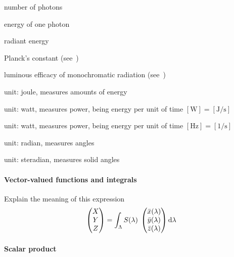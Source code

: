 \begin{description}[leftmargin=!,labelwidth={5em}]
\item[{$N_p\;[]$} ] number of photons
\item[{$Q_p\;[\unit\joule]$} ] energy of one photon
\item[{$Q_e\;[\unit\joule]$} ] radiant energy


\item[{$h$} ] Planck's constant (see~\cite{bipm:si.2019})
\item[{$K_{cd}$} ] luminous efficacy of monochromatic radiation (see~\cite{bipm:si.2019})

\item[{$\unit\joule$} ] unit: joule, measures amounts of energy
\item[{$\unit\watt$} ] unit: watt, measures power, being energy per 
	unit of time $[\unit\watt] = [\unit{\joule\per\second}]$
\item[{$\unit\hertz$} ] unit: watt, measures power, being energy per 
	unit of time $[\unit\hertz] = [\unit{1\per\second}]$
\item[{$\unit\radian$} ] 	unit: radian, measures angles
\item[{$\unit\steradian$} ] unit: steradian, measures solid angles
                   
\end{description}

\paragraph{Vector-valued functions and integrals}

\begin{inconstruction}
	Explain the meaning of this expression
	\begin{displaymath}
		\begin{pmatrix}X\\Y\\Z\end{pmatrix}
		= \int_\Lambda S(\lambda)\; 
		\begin{pmatrix}
			\bar x(\lambda)\\
			\bar y(\lambda)\\
			\bar z(\lambda)
		\end{pmatrix}
		\mathop{}\!\mathrm{d}\lambda
	\end{displaymath}
\end{inconstruction}


\paragraph{Scalar product}

